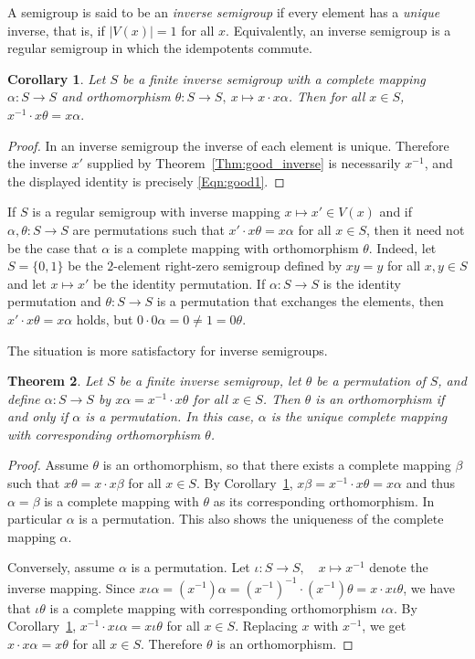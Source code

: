 \documentclass[11pt]{article}
\theoremstyle{plain}
\newtheorem{theorem}{Theorem}[section]
\newtheorem{cor}[theorem]{Corollary}
\theoremstyle{remark}
\theoremstyle{definition}
\theoremstyle{plain}
\newcommand{\inv}{^{-1}}
\begin{document}
A semigroup is said to be an \emph{inverse semigroup} if every element has a \emph{unique} inverse, that is, if $|V(x)| = 1$
for all $x$. Equivalently, an inverse semigroup is a regular semigroup in which the idempotents commute.

\begin{cor}\label{Cor:inv_ortho}
Let $S$ be a finite inverse semigroup with a complete mapping $\alpha\colon S\to S$ and orthomorphism $\theta\colon S\to S,\ x\mapsto x\cdot x\alpha$.
Then for all $x\in S$,
\(x\inv\cdot x\theta = x\alpha.\)
\end{cor}

\begin{proof}
In an inverse semigroup the inverse of each element is unique. Therefore the
inverse $x'$ supplied by Theorem~\ref{Thm:good_inverse} is necessarily
$x\inv$, and the displayed identity is precisely \eqref{Eqn:good1}.
\end{proof}

If $S$ is a regular semigroup with inverse mapping $x\mapsto x'\in V(x)$ and if $\alpha,\theta\colon S\to S$ are permutations such that
$x'\cdot x\theta = x\alpha$ for all $x\in S$, then it need not be the case that $\alpha$ is a complete mapping with orthomorphism $\theta$.
Indeed, let $S=\{0,1\}$ be the $2$-element right-zero semigroup defined by $xy=y$ for all $x,y\in S$ and let $x\mapsto x'$ be the identity
permutation. If $\alpha\colon S\to S$ is the identity permutation and $\theta\colon S\to S$ is a permutation that exchanges the elements, then
$x'\cdot x\theta = x\alpha$ holds, but $0\cdot 0\alpha = 0 \ne 1 = 0\theta$.

The situation is more satisfactory for inverse semigroups.

\begin{theorem}\label{Thm:inv_ortho}
Let $S$ be a finite inverse semigroup, let $\theta$ be a permutation of $S$, and define $\alpha\colon S\to S$ by $x\alpha = x\inv\cdot x\theta$ for all $x\in S$. Then $\theta$ is an orthomorphism if and only if $\alpha$ is a permutation. In this case, $\alpha$ is the unique complete mapping with
corresponding orthomorphism $\theta$.
\end{theorem}
\begin{proof}
Assume $\theta$ is an orthomorphism, so that there exists a complete mapping $\beta$ such that $x\theta = x\cdot x\beta$ for all $x\in S$. By Corollary~\ref{Cor:inv_ortho}, $x\beta = x\inv\cdot x\theta = x\alpha$ and thus $\alpha = \beta$ is a complete mapping with $\theta$ as its corresponding orthomorphism. In particular $\alpha$ is a permutation. This also shows the uniqueness of the complete mapping $\alpha$.

Conversely, assume $\alpha$ is a permutation. Let $\iota\colon S\to S,\quad x\mapsto x\inv$ denote the inverse mapping. Since $x\iota\alpha = (x\inv)\alpha = (x\inv)\inv\cdot (x\inv)\theta = x\cdot x\iota\theta$, we have that $\iota\theta$ is a complete mapping with corresponding orthomorphism $\iota\alpha$. By Corollary~\ref{Cor:inv_ortho}, $x\inv\cdot x\iota\alpha = x\iota\theta$ for all $x\in S$. Replacing $x$ with $x\inv$, we get $x\cdot x\alpha = x\theta$ for all $x\in S$. Therefore $\theta$ is an orthomorphism.
\end{proof}
\end{document}
